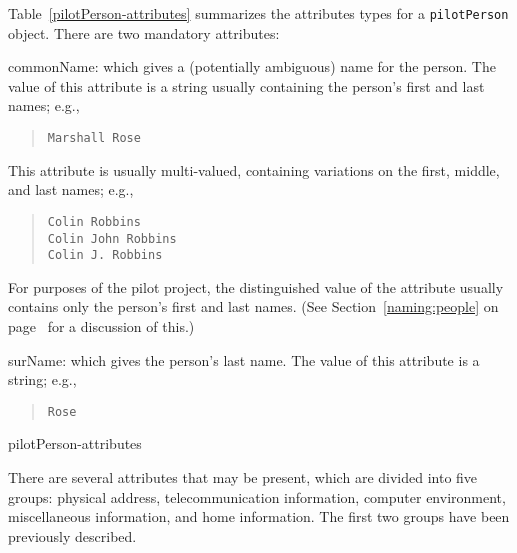 Table~\ref{pilotPerson-attributes} summarizes the attributes types for
a \verb"pilotPerson" object.
There are two mandatory attributes:
\begin{describe}
\item[commonName:]
			which gives a (potentially ambiguous) name for
			the person.
			The value of this attribute is a string usually
			containing the person's first and last names; e.g.,
\begin{quote}\small\begin{verbatim}
Marshall Rose
\end{verbatim}\end{quote}
			This attribute is usually multi-valued, containing
			variations on the first, middle, and last names; e.g.,
\begin{quote}\small\begin{verbatim}
Colin Robbins
Colin John Robbins
Colin J. Robbins
\end{verbatim}\end{quote}
			For purposes of the pilot project, the distinguished
			value of the attribute usually contains only the
			person's first and last names.
			(See Section~\ref{naming:people} on 
			page~\pageref{naming:people} for a discussion of this.)

\item[surName:]
			which gives the person's last name.
			The value of this attribute is a string; e.g.,
\begin{quote}\small\begin{verbatim}
Rose
\end{verbatim}\end{quote}
\end{describe}
%
	{pilotPerson-attributes}

There are several attributes that may be present,
which are divided into five groups:
physical address, telecommunication information, 
computer environment,
miscellaneous information,
and home information.
The first two groups have been previously described.

